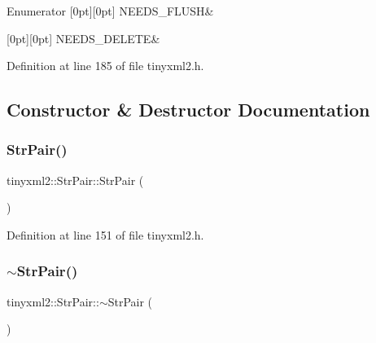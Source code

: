 \begin{DoxyEnumFields}{Enumerator}
[0pt][0pt]{}\mbox{\label{classtinyxml2_1_1_str_pair_a476a92d76f24486c3ae4731916b12aaea2d8841daedc3955ed20ec9f760318434}} 
N\+E\+E\+D\+S\+\_\+\+F\+L\+U\+SH&\\
\hline

[0pt][0pt]{}\mbox{\label{classtinyxml2_1_1_str_pair_a476a92d76f24486c3ae4731916b12aaeab9a3152ce5df9e7f4bbf3774fe862c75}} 
N\+E\+E\+D\+S\+\_\+\+D\+E\+L\+E\+TE&\\
\hline

\end{DoxyEnumFields}


Definition at line 185 of file tinyxml2.\+h.



\subsection{Constructor \& Destructor Documentation}
\mbox{\label{classtinyxml2_1_1_str_pair_a69153963f7052de9f767d3d8c1623a70}} 
\subsubsection{StrPair()\hspace{0.1cm}{\footnotesize\ttfamily [1/2]}}
{\footnotesize\ttfamily tinyxml2\+::\+Str\+Pair\+::\+Str\+Pair (\begin{DoxyParamCaption}{ }\end{DoxyParamCaption})\hspace{0.3cm}{\ttfamily [inline]}}



Definition at line 151 of file tinyxml2.\+h.

\mbox{\label{classtinyxml2_1_1_str_pair_a60bed84d2503296e1c2a73fcef1431f9}} 
\subsubsection{$\sim$StrPair()}
{\footnotesize\ttfamily tinyxml2\+::\+Str\+Pair\+::$\sim$\+Str\+Pair (\begin{DoxyParamCaption}{ }\end{DoxyParamCaption})}




